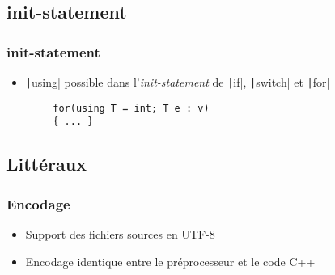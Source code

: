 \documentclass[C++.tex]{subfiles}
\begin{document}
\subsection*{init-statement}
\begin{frame}[fragile]
	\frametitle{init-statement}
	\begin{itemize}
		\item \texttt|using| possible dans l'\textit{init-statement} de \texttt|if|, \texttt|switch| et \texttt|for|
	\end{itemize}

	\begin{verbatim}
		for(using T = int; T e : v)
		{ ... }
	\end{verbatim}


\end{frame}

\subsection*{Littéraux}
\begin{frame}[fragile]
	\frametitle{Encodage}
	\begin{itemize}
		\item Support des fichiers sources en UTF-8
		\item Encodage identique entre le préprocesseur et le code C++
	\end{itemize}

\end{frame}
\end{document}
